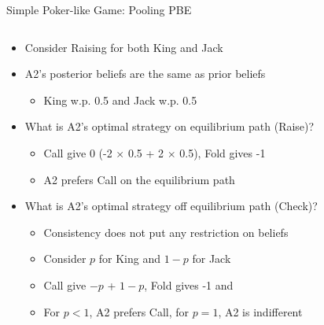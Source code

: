 \documentclass[11pt,aspectratio=169]{beamer}
\begin{document}
  
  \begin{frame}{Simple Poker-like Game: Pooling PBE}
   \begin{columns}
    \begin{column}{0.6\textwidth}
     \begin{itemize}[<+->] \scriptsize
     \setlength{\itemsep}{0.7em}
      \item Consider Raising for both King and Jack
      \item A2's posterior beliefs are the same as prior beliefs
      \begin{itemize}\scriptsize
       \item King w.p. 0.5 and Jack w.p. 0.5
      \end{itemize}
      \item What is A2's optimal strategy on equilibrium path (Raise)?
      \begin{itemize}\scriptsize
       \item Call give 0 (-2 $\times$ 0.5 + 2 $\times$ 0.5), Fold gives -1
       \item A2 prefers Call on the equilibrium path
      \end{itemize}
      \item What is A2's optimal strategy off equilibrium path (Check)?
      \begin{itemize}\scriptsize
       \item Consistency does not put any restriction on beliefs
       \item Consider $p$ for King and $1-p$ for Jack
       \item Call give $-p$ + $1-p$, Fold gives -1 and 
       \item For $p<1$, A2 prefers Call, for $p=1$, A2 is indifferent
      \end{itemize}
     \end{itemize}
    \end{column}
    \begin{column}{0.4\textwidth}   
     \begin{center}
\end{center}
\end{column}
\end{columns}
\end{frame}
\end{document}
